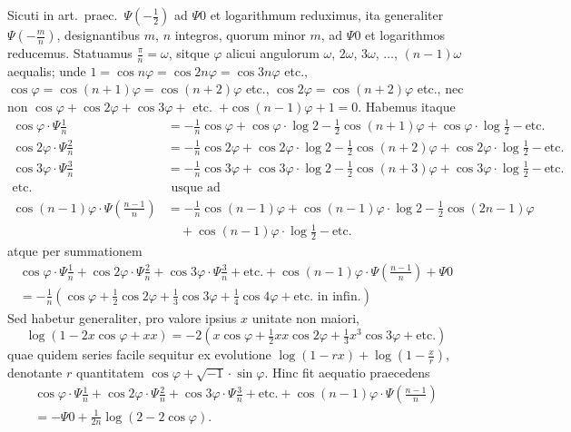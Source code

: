 \documentclass[12pt,a4paper]{article}
\begin{document}
Sicuti in art.\ praec.\ $\Psi(-\frac{1}{2})$ ad $\Psi0$ et logarithmum reduximus, ita generaliter $\Psi(-\frac{m}{n})$, designantibus $m$, $n$ integros, quorum minor $m$, ad $\Psi0$ et logarithmos reducemus. Statuamus $\frac{\pi}{n}=\omega$, sitque $\varphi$ alicui angulorum $\omega$, $2\omega$, $3\omega$, $\ldots$, $(n-1)\omega$ aequalis; unde $1=\cos n\varphi=\cos2n\varphi=\cos3n\varphi$ etc., $\cos\varphi=\cos(n+1)\varphi=\cos(n+2)\varphi$ etc., $\cos2\varphi=\cos(n+2)\varphi$ etc., nec non $\cos\varphi+\cos2\varphi+\cos3\varphi+$ etc.\ $+\cos(n-1)\varphi+1=0$. Habemus itaque
\begin{align*}
\cos\varphi\cdot\Psi\tfrac{1}{n} &= -\tfrac{1}{n}\cos\varphi + \cos\varphi\cdot\log2 - \tfrac{1}{2}\cos(n+1)\varphi + \cos\varphi\cdot\log\tfrac{1}{2} - \text{etc.}\\
\cos2\varphi\cdot\Psi\tfrac{2}{n} &= -\tfrac{1}{n}\cos2\varphi + \cos2\varphi\cdot\log2 - \tfrac{1}{2}\cos(n+2)\varphi + \cos2\varphi\cdot\log\tfrac{1}{2} - \text{etc.}\\
\cos3\varphi\cdot\Psi\tfrac{3}{n} &= -\tfrac{1}{n}\cos3\varphi + \cos3\varphi\cdot\log2 - \tfrac{1}{2}\cos(n+3)\varphi + \cos3\varphi\cdot\log\tfrac{1}{2} - \text{etc.}\\
\text{etc.}&\text{ usque ad}\\
\cos(n-1)\varphi\cdot\Psi(\tfrac{n-1}{n}) &= -\tfrac{1}{n}\cos(n-1)\varphi + \cos(n-1)\varphi\cdot\log2 - \tfrac{1}{2}\cos(2n-1)\varphi\\
&\quad + \cos(n-1)\varphi\cdot\log\tfrac{1}{2} - \text{etc.}
\end{align*}
atque per summationem
\begin{multline*}
\cos\varphi\cdot\Psi\tfrac{1}{n} + \cos2\varphi\cdot\Psi\tfrac{2}{n} + \cos3\varphi\cdot\Psi\tfrac{3}{n} + \text{etc.} + \cos(n-1)\varphi\cdot\Psi(\tfrac{n-1}{n}) + \Psi0\\
= -\tfrac{1}{n}(\cos\varphi + \tfrac{1}{2}\cos2\varphi + \tfrac{1}{3}\cos3\varphi + \tfrac{1}{4}\cos4\varphi + \text{etc.\ in infin.})
\end{multline*}
Sed habetur generaliter, pro valore ipsius $x$ unitate non maiori,
\[
\log(1-2x\cos\varphi+xx) = -2(x\cos\varphi + \tfrac{1}{2}xx\cos2\varphi + \tfrac{1}{3}x^3\cos3\varphi + \text{etc.})
\]
quae quidem series facile sequitur ex evolutione $\log(1-rx)+\log(1-\frac{x}{r})$, denotante $r$ quantitatem $\cos\varphi+\sqrt{-1}\cdot\sin\varphi$. Hinc fit aequatio praecedens
\begin{multline}
\cos\varphi\cdot\Psi\tfrac{1}{n} + \cos2\varphi\cdot\Psi\tfrac{2}{n} + \cos3\varphi\cdot\Psi\tfrac{3}{n} + \text{etc.} + \cos(n-1)\varphi\cdot\Psi(\tfrac{n-1}{n})\\
= -\Psi0 + \tfrac{1}{2n}\log(2-2\cos\varphi).\tag{[72]}
\end{multline}
\end{document}
